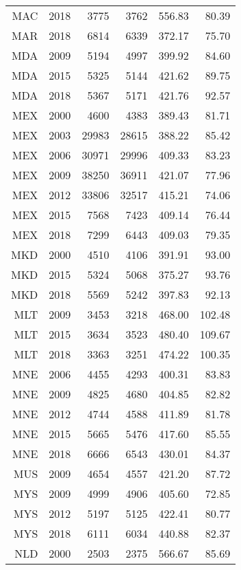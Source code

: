 \begin{longtable}{|r|r|r|r|r|r|}
    MAC   & 2018  & 3775  & 3762  & 556.83 & 80.39 \\
    MAR   & 2018  & 6814  & 6339  & 372.17 & 75.70 \\
    MDA   & 2009  & 5194  & 4997  & 399.92 & 84.60 \\
    MDA   & 2015  & 5325  & 5144  & 421.62 & 89.75 \\
    MDA   & 2018  & 5367  & 5171  & 421.76 & 92.57 \\
    MEX   & 2000  & 4600  & 4383  & 389.43 & 81.71 \\
    MEX   & 2003  & 29983 & 28615 & 388.22 & 85.42 \\
    MEX   & 2006  & 30971 & 29996 & 409.33 & 83.23 \\
    MEX   & 2009  & 38250 & 36911 & 421.07 & 77.96 \\
    MEX   & 2012  & 33806 & 32517 & 415.21 & 74.06 \\
    MEX   & 2015  & 7568  & 7423  & 409.14 & 76.44 \\
    MEX   & 2018  & 7299  & 6443  & 409.03 & 79.35 \\
    MKD   & 2000  & 4510  & 4106  & 391.91 & 93.00 \\
    MKD   & 2015  & 5324  & 5068  & 375.27 & 93.76 \\
    MKD   & 2018  & 5569  & 5242  & 397.83 & 92.13 \\
    MLT   & 2009  & 3453  & 3218  & 468.00 & 102.48 \\
    MLT   & 2015  & 3634  & 3523  & 480.40 & 109.67 \\
    MLT   & 2018  & 3363  & 3251  & 474.22 & 100.35 \\
    MNE   & 2006  & 4455  & 4293  & 400.31 & 83.83 \\
    MNE   & 2009  & 4825  & 4680  & 404.85 & 82.82 \\
    MNE   & 2012  & 4744  & 4588  & 411.89 & 81.78 \\
    MNE   & 2015  & 5665  & 5476  & 417.60 & 85.55 \\
    MNE   & 2018  & 6666  & 6543  & 430.01 & 84.37 \\
    MUS   & 2009  & 4654  & 4557  & 421.20 & 87.72 \\
    MYS   & 2009  & 4999  & 4906  & 405.60 & 72.85 \\
    MYS   & 2012  & 5197  & 5125  & 422.41 & 80.77 \\
    MYS   & 2018  & 6111  & 6034  & 440.88 & 82.37 \\
    NLD   & 2000  & 2503  & 2375  & 566.67 & 85.69 \\

\end{longtable}
